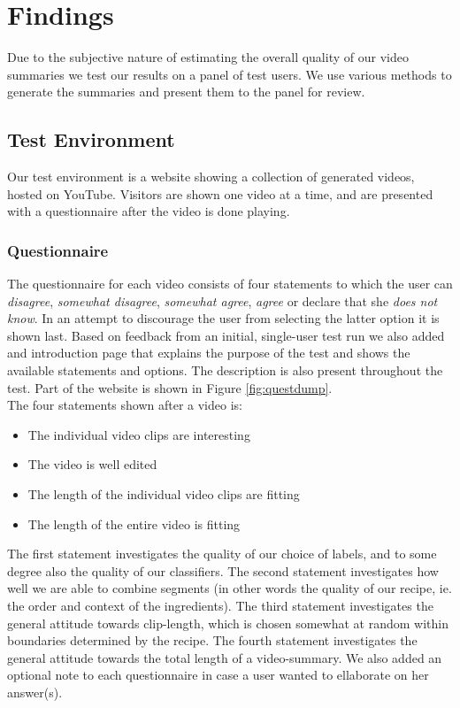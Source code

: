 %
\section{Findings}
%
Due to the subjective nature of estimating the overall quality of our video summaries we test our results on a panel of test users. We use various methods to generate the summaries and present them to the panel for review.
%
\subsection{Test Environment}
%
Our test environment is a website showing a collection of generated videos, hosted on YouTube. Visitors are shown one video at a time, and are presented with a questionnaire after the video is done playing.
%
\subsubsection{Questionnaire}\label{sec:questionnaire}
%
%
The questionnaire for each video consists of four statements to which the user can \textit{disagree}, \textit{somewhat disagree}, \textit{somewhat agree}, \textit{agree} or declare that she \textit{does not know}. In an attempt to discourage the user from selecting the latter option it is shown last. Based on feedback from an initial, single-user test run we also added and introduction page that explains the purpose of the test and shows the available statements and options. The description is also present throughout the test. Part of the website is shown in Figure \ref{fig:questdump}.\\
%
The four statements shown after a video is:
%
\begin{itemize}
\item The individual video clips are interesting
\item The video is well edited
\item The length of the individual video clips are fitting
\item The length of the entire video is fitting
\end{itemize}
%
The first statement investigates the quality of our choice of labels, and to some degree also the quality of our classifiers. The second statement investigates how well we are able to combine segments (in other words the quality of our recipe, ie. the order and context of the ingredients). The third statement investigates the general attitude towards clip-length, which is chosen somewhat at random within boundaries determined by the recipe. The fourth statement investigates the general attitude towards the total length of a video-summary. We also added an optional note to each questionnaire in case a user wanted to ellaborate on her answer(s).
